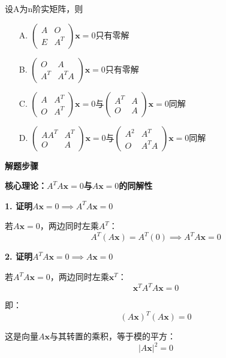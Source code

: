 \documentclass[standard]{ExBook}
\begin{document}
\begin{qitems}
    \begin{bbox}
        \qitem 设A为n阶实矩阵，则
        \begin{itemize}
            \item[A.] $\begin{pmatrix} A & O \\ E & A^T \end{pmatrix}\mathbf{x} = 0$只有零解
            \item[B.] $\begin{pmatrix} O & A \\ A^T & A^TA \end{pmatrix}\mathbf{x} = 0$只有零解
            \item[C.] $\begin{pmatrix} A & A^T \\ O & A^T \end{pmatrix}\mathbf{x} = 0$与$\begin{pmatrix} A^T & A \\ O & A \end{pmatrix}\mathbf{x} = 0$同解
            \item[D.] $\begin{pmatrix} AA^T & A^T \\ O & A \end{pmatrix}\mathbf{x} = 0$与$\begin{pmatrix} A^2 & A^T \\ O & A^TA \end{pmatrix}\mathbf{x} = 0$同解
        \end{itemize}
        \begin{solution}
            \textbf{解题步骤}
            
            \textbf{核心理论：$A^TA\mathbf{x}=0$与$A\mathbf{x}=0$的同解性}
            
            \textbf{1. 证明$A\mathbf{x}=0 \implies A^TA\mathbf{x}=0$}
            
            若$A\mathbf{x}=0$，两边同时左乘$A^T$：
            $$A^T(A\mathbf{x}) = A^T(0) \implies A^TA\mathbf{x}=0$$
            
            \textbf{2. 证明$A^TA\mathbf{x}=0 \implies A\mathbf{x}=0$}
            
            若$A^TA\mathbf{x}=0$，两边同时左乘$\mathbf{x}^T$：
            $$\mathbf{x}^TA^TA\mathbf{x}=0$$
            
            即：$$(A\mathbf{x})^T(A\mathbf{x})=0$$
            
            这是向量$A\mathbf{x}$与其转置的乘积，等于模的平方：
            $$|A\mathbf{x}|^2=0$$
            

\end{solution}
\end{bbox}
\end{qitems}
\end{document}
